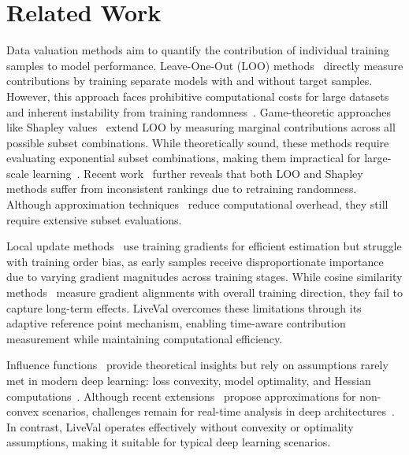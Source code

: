 \section{Related Work}
Data valuation methods aim to quantify the contribution of individual training samples to model performance. Leave-One-Out (LOO) methods~\cite{cook1977detection,sharchilev2018finding} directly measure contributions by training separate models with and without target samples. However, this approach faces prohibitive computational costs for large datasets and inherent instability from training randomness~\cite{sim2022data}.
Game-theoretic approaches like Shapley values~\cite{shapley1953,wang2020principled} extend LOO by measuring marginal contributions across all possible subset combinations. While theoretically sound, these methods require evaluating exponential subset combinations, making them impractical for large-scale learning~\cite{ghorbani2019data,sun2023shapleyfl,kwon2022beta}. Recent work~\cite{wang2023data,li2024robust} further reveals that both LOO and Shapley methods suffer from inconsistent rankings due to retraining randomness. Although approximation techniques~\cite{luo2024fast,zhang2023efficient} reduce computational overhead, they still require extensive subset evaluations.

Local update methods~\cite{pruthi2020estimating,paul2021deep,tan2023data} use training gradients for efficient estimation but struggle with training order bias, as early samples receive disproportionate importance due to varying gradient magnitudes across training stages. While cosine similarity methods~\cite{miao2022privacy,fung2018mitigating} measure gradient alignments with overall training direction, they fail to capture long-term effects. LiveVal overcomes these limitations through its adaptive reference point mechanism, enabling time-aware contribution measurement while maintaining computational efficiency.

Influence functions~\cite{koh2017understanding} provide theoretical insights but rely on assumptions rarely met in modern deep learning: loss convexity, model optimality, and Hessian computations~\cite{basu2021influence,hammoudeh2024training}. Although recent extensions~\cite{koh2019accuracy,basu2020second,schioppa2022scaling} propose approximations for non-convex scenarios, challenges remain for real-time analysis in deep architectures~\cite{basu2021influence}. In contrast, LiveVal operates effectively without convexity or optimality assumptions, making it suitable for typical deep learning scenarios.